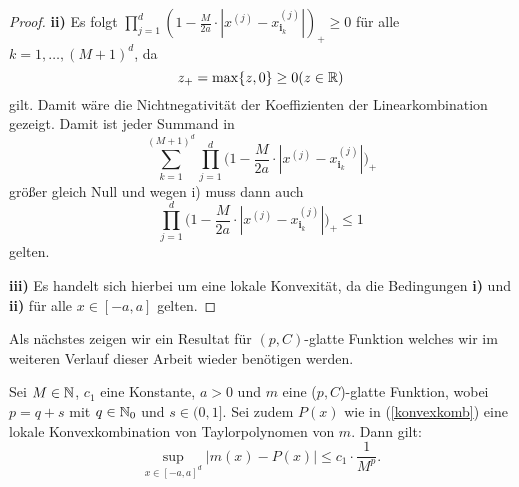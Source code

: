 \begin{proof}
\textbf{ii)} Es folgt $\prod_{j = 1}^d (1 - \frac{M}{2a} \cdot |x^{(j)} - x_{\mathbf{i}_k}^{(j)}|)_+ \geq 0$ für alle $k = 1,\dots, (M + 1)^d$, da $$z_+= \max\{z, 0\} \geq 0 (z \in \mathbb{R})$$ gilt. Damit wäre die Nichtnegativität der Koeffizienten der Linearkombination gezeigt. Damit ist jeder Summand in $$\sum_{k = 1}^{(M + 1)^d} \prod_{j = 1}^d \bigg(1 - \frac{M}{2a} \cdot |x^{(j)} - x_{\mathbf{i}_k}^{(j)}|\bigg)_+$$ größer gleich Null und wegen i) muss dann auch $$\prod_{j = 1}^d \bigg(1 - \frac{M}{2a} \cdot |x^{(j)} - x_{\mathbf{i}_k}^{(j)}|\bigg)_+ \leq 1$$ gelten.

\textbf{iii)} Es handelt sich hierbei um eine lokale Konvexität, da die Bedingungen \textbf{i)} und \textbf{ii)} für alle $x \in [-a, a]$ gelten.
\end{proof}
Als nächstes zeigen wir ein Resultat für $(p, C)$-glatte Funktion welches wir im weiteren Verlauf dieser Arbeit wieder benötigen werden.
\begin{lem}
\label{lem:pcsmooth}
Sei $M \in \mathbb{N}$, $c_1$ eine Konstante, $a > 0$ und $m$ eine ($p, C$)-glatte Funktion, wobei $p = q + s$ mit $q \in \mathbb{N}_0$ und $s \in (0,1]$. Sei zudem $P(x)$ wie in (\ref{konvexkomb}) eine lokale Konvexkombination von Taylorpolynomen von $m$. Dann gilt$\colon$
$$\sup_{x \in [-a, a]^d} |m(x) - P(x)|  \leq c_1 \cdot \frac{1}{M^p}.$$
\end{lem}
